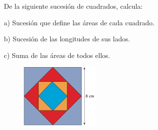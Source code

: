 \vspace{-8mm}
\begin{flushright}
\begin{footnotesize} \textcolor{gris}{}	\end{footnotesize}
\end{flushright}
\vspace{-10mm}
\begin{flushright}
\begin{footnotesize} \textcolor{gris}{}	\end{footnotesize}
\end{flushright}


\begin{mipropuesto}

\begin{multicols}{2}

De la siguiente sucesión de cuadrados, calcula:

\vspace{3mm} a) Sucesión que define las áreas de cada cuadrado.	

b) Sucesión de las longitudes de sus lados.

c) Suma de las áreas de todos ellos.

\begin{figure}[H]
	\centering
	\includegraphics[width=0.35\textwidth]{img-suc/suc04.png}
\end{figure}


\end{multicols}

\end{mipropuesto}

\vspace{-8mm}
\begin{flushright}
\begin{footnotesize} \textcolor{gris}{}	\end{footnotesize}
\end{flushright}



